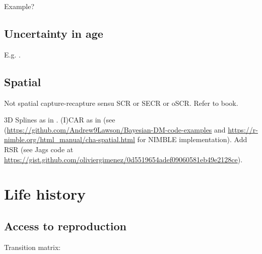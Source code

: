 \documentclass[
  12pt,
]{krantz}
\begin{document}
Example?

\hypertarget{uncertainty-in-age}{%
\section{Uncertainty in age}\label{uncertainty-in-age}}

E.g. \citet{Gervasi2017}.

\hypertarget{spatial}{%
\section{Spatial}\label{spatial}}

Not spatial capture-recapture sensu SCR or SECR or oSCR. Refer to book.

3D Splines as in \citet{Peron2011}. (I)CAR as in \citet{saracco2010icar} (see (\url{https://github.com/Andrew9Lawson/Bayesian-DM-code-examples} and \url{https://r-nimble.org/html_manual/cha-spatial.html} for NIMBLE implementation). Add RSR \citet{khan2022rsr} (see Jags code at \url{https://gist.github.com/oliviergimenez/0d5519654adef09060581eb49e2128ce}).

\hypertarget{tradeoffs}{%
\chapter{Life history}\label{tradeoffs}}

\hypertarget{access-to-reproduction}{%
\section{Access to reproduction}\label{access-to-reproduction}}

\citet{pradel1997}

Transition matrix:
\end{document}
